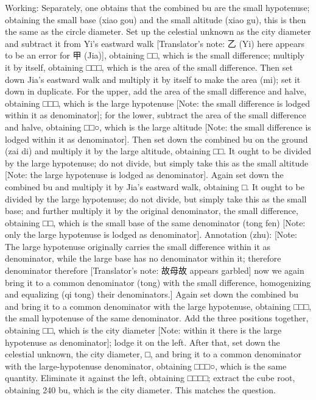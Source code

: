 \documentclass[11pt]{article}
\newenvironment{uniten}{\par\small\color{black!85}}{\par\medskip}
\begin{document}
\begin{uniten}Working: Separately, one obtains that the combined bu are the small hypotenuse; obtaining the small base (xiao gou) and the small altitude (xiao gu), this is then the same as the circle diameter. Set up the celestial unknown as the city diameter and subtract it from Yi's eastward walk [Translator's note: 乙 (Yi) here appears to be an error for 甲 (Jia)], obtaining □□, which is the small difference; multiply it by itself, obtaining □□□, which is the area of the small difference. Then set down Jia's eastward walk and multiply it by itself to make the area (mi); set it down in duplicate. For the upper, add the area of the small difference and halve, obtaining □□□, which is the large hypotenuse [Note: the small difference is lodged within it as denominator]; for the lower, subtract the area of the small difference and halve, obtaining □□○, which is the large altitude [Note: the small difference is lodged within it as denominator]. Then set down the combined bu on the ground (zai di) and multiply it by the large altitude, obtaining □□. It ought to be divided by the large hypotenuse; do not divide, but simply take this as the small altitude [Note: the large hypotenuse is lodged as denominator]. Again set down the combined bu and multiply it by Jia's eastward walk, obtaining □. It ought to be divided by the large hypotenuse; do not divide, but simply take this as the small base; and further multiply it by the original denominator, the small difference, obtaining □□, which is the small base of the same denominator (tong fen) [Note: only the large hypotenuse is lodged as denominator]. Annotation (zhu): [Note: The large hypotenuse originally carries the small difference within it as denominator, while the large base has no denominator within it; therefore denominator therefore [Translator's note: 故母故 appears garbled] now we again bring it to a common denominator (tong) with the small difference, homogenizing and equalizing (qi tong) their denominators.] Again set down the combined bu and bring it to a common denominator with the large hypotenuse, obtaining □□□, the small hypotenuse of the same denominator. Add the three positions together, obtaining □□, which is the city diameter [Note: within it there is the large hypotenuse as denominator]; lodge it on the left. After that, set down the celestial unknown, the city diameter, □, and bring it to a common denominator with the large-hypotenuse denominator, obtaining □□□○, which is the same quantity. Eliminate it against the left, obtaining □□□□; extract the cube root, obtaining 240 bu, which is the city diameter. This matches the question.\end{uniten}
\end{document}

